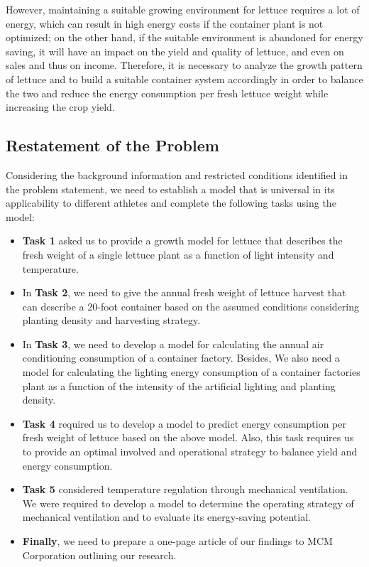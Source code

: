 However, maintaining a suitable growing environment for lettuce requires a lot of energy, which can result in high energy costs if the container plant is not optimized; on the other hand, if the suitable environment is abandoned for energy saving, it will have an impact on the yield and quality of lettuce, and even on sales and thus on income. Therefore, it is necessary to analyze the growth pattern of lettuce and to build a suitable container system accordingly in order to balance the two and reduce the energy consumption per fresh lettuce weight while increasing the crop yield.

\subsection{Restatement of the Problem}



Considering the background information and restricted conditions identified in the problem statement, we need to establish a model that is universal in its applicability to different athletes
and complete the following tasks using the model:    
\begin{itemize}
    \item \textbf{Task 1} asked us to provide a growth model for lettuce that describes the fresh weight of a single lettuce plant as a function of light intensity and temperature. 
    \item In \textbf{Task 2}, we need to give the annual fresh weight of lettuce harvest that can describe a 20-foot container based on the assumed conditions considering planting density and harvesting strategy.
    \item In \textbf{Task 3}, we need to develop a model for calculating the annual air conditioning consumption of a container factory. Besides, We also need a model for calculating the lighting energy consumption of a container factories plant as a 
    function of the intensity of the artificial lighting and planting density.
    \item \textbf{Task 4} required us to develop a model to predict energy consumption per fresh weight of lettuce based on the above model. Also, this task requires us to provide an optimal involved and operational strategy to balance yield and energy consumption.
    \item \textbf{Task 5}  considered temperature regulation through mechanical ventilation. We were required to develop a model to determine the operating strategy of mechanical ventilation and to evaluate its energy-saving potential.
    \item \textbf{Finally}, we need to prepare a one-page article of our findings to MCM Corporation outlining our research.

\end{itemize}


